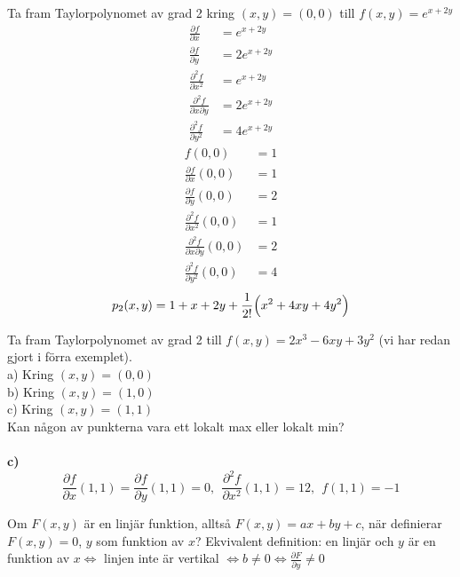\documentclass{report}
\begin{document}
\qs{}
{
	Ta fram Taylorpolynomet av grad 2 kring $ (x,y) = (0,0) $ till $ f(x,y) = e^{x+2y} $ 
}
\sol 
\begin{align*}
	\frac{\partial f }{\partial x } &= e^{x+2y}\\
	\frac{\partial f }{\partial y } &= 2e^{x+2y}\\
	\frac{\partial^2 f }{\partial x^2 } &= e^{x+2y}\\
	\frac{\partial^2 f }{\partial x \partial y } &=2e^{x+2y}\\
	\frac{\partial^2 f }{\partial y^2 } &= 4e^{x+2y}
\end{align*}
\begin{align*}
	f(0,0) &= 1\\
	\frac{\partial f }{\partial x } (0,0) &= 1\\
	\frac{\partial f }{\partial y } (0,0) &= 2\\
	\frac{\partial^2 f }{\partial x^2 } (0,0) &= 1\\
	\frac{\partial^2 f }{\partial x \partial y }(0,0) &= 2\\
	\frac{\partial^2 f }{\partial y^2 }(0,0) &= 4
\end{align*}
\begin{equation*}
p_2(x,y) = 1 + x + 2y + \frac{1}{2!} \Bigl( x^2 + 4xy + 4y^2  \Bigr) 
\end{equation*}

\vspace{20pt}
\ex{}
{
Ta fram Taylorpolynomet av grad 2 till $ f(x,y) = 2x^3-6xy+3y^2 $ (vi har redan gjort i förra exemplet).\\
a) Kring $ (x,y) = (0,0)$\\
b) Kring $ (x,y) = (1,0) $\\
c) Kring $ (x,y) = (1,1) $\\
Kan någon av punkterna vara ett lokalt max eller lokalt min?\\\\

\textbf{c)}\\
\begin{equation*}
\frac{\partial f }{\partial x } (1,1) = \frac{\partial f }{\partial y } (1,1) = 0,\:\: \frac{\partial^2 f }{\partial x^2 } (1,1) = 12,\:\: f(1,1) = -1
\end{equation*}
}

{
Om $ F(x,y) $ är en linjär funktion, alltså $ F(x,y) = ax+by+c $, när definierar $ F(x,y) = 0 $, $ y $ som funktion av $ x $? Ekvivalent definition: en linjär och $ y $ är en funktion av $ x \iff  $ linjen inte är vertikal $ \iff  b \ne 0	\iff \frac{\partial F }{\partial y } \ne 0$  
}
\end{document}
